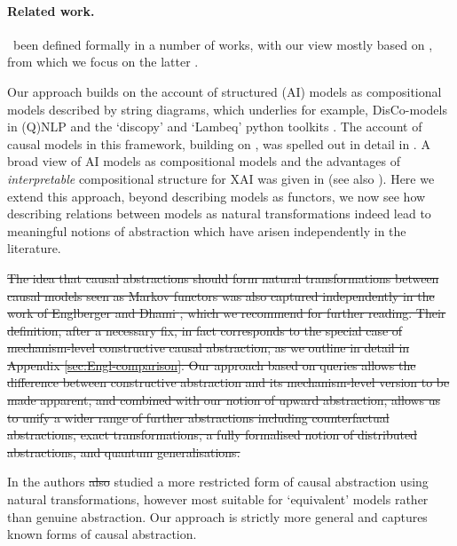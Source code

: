 \documentclass{article}
\begin{document}
\paragraph{Related work.}
\ been defined formally in a number of works, with our view mostly based on \cite{rubenstein2017causal,BeckersEtAl_2019_AbstractingCausalModles,geiger2023causal,xia2024neural}, from which we focus on the latter .  

Our approach builds on the account of structured (AI) models as compositional models described by string diagrams, which underlies for example, DisCo-models in (Q)NLP \cite{coecke2010mathematical,coecke2021mathematics,wang2023distilling} and the `discopy' and `Lambeq' python toolkits \cite{de2020discopy,kartsaklis2021lambeq}. The account of causal models in this framework, building on \cite{jacobs2019causal,fritz2023d}, was spelled out in detail in \cite{lorenz2023causal}. A broad view of AI models as compositional models and the advantages of \emph{interpretable} compositional structure for XAI was given in \cite{tull2024towards} (see also \cite{de2022categorical}). Here we extend this approach, beyond describing models as functors, we now see how describing relations between models as natural transformations indeed lead to meaningful notions of abstraction which have arisen independently in the literature. 

\st{The idea that causal abstractions should form natural transformations between causal models seen as Markov functors was also captured independently in the work of Englberger and Dhami \cite{englberger2025causal}, which we recommend for further reading. Their definition, after a necessary fix, in fact corresponds to the special case of mechanism-level constructive causal abstraction, as we outline in detail in Appendix \ref{sec:Engl-comparison}. Our approach based on queries allows the difference between constructive abstraction and its mechanism-level version to be made apparent, and combined with our notion of upward abstraction, allows us to unify a wider range of further abstractions including counterfactual abstractions, exact transformations, a fully formalised notion of distributed abstractions, and quantum generalisations.}

In \cite{otsuka2022equivalence} the authors \st{also} studied a more restricted form of causal abstraction using natural transformations, however most suitable for `equivalent' models rather than genuine abstraction. Our approach is strictly more general and captures known forms of causal abstraction. 
 
\end{document}
